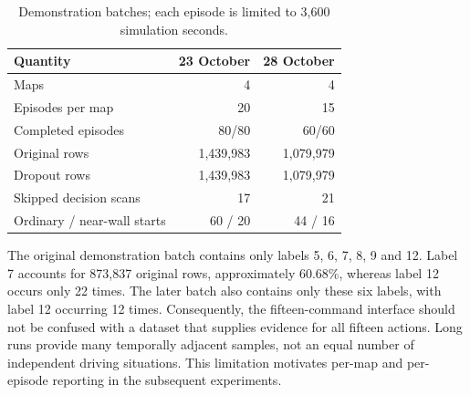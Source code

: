 \begin{table}[htbp]
\centering\small
\caption[Demonstration batch composition]{Demonstration batches; each episode is limited to 3,600 simulation seconds.}
\label{tab:batches}
\begin{tabular}{lrr}
\toprule Quantity & 23 October & 28 October \\\midrule
Maps & 4 & 4 \\
Episodes per map & 20 & 15 \\
Completed episodes & 80/80 & 60/60 \\
Original rows & 1,439,983 & 1,079,979 \\
Dropout rows & 1,439,983 & 1,079,979 \\
Skipped decision scans & 17 & 21 \\
Ordinary / near-wall starts & 60 / 20 & 44 / 16 \\
\bottomrule
\end{tabular}
\end{table}

The original demonstration batch contains only labels 5, 6, 7, 8, 9 and 12. Label 7 accounts
for 873,837 original rows, approximately 60.68\%, whereas label 12 occurs only
22 times. The later batch also contains only these six labels, with label 12
occurring 12 times. Consequently, the fifteen-command interface should not be
confused with a dataset that supplies evidence for all fifteen actions.
Long runs provide many temporally adjacent samples, not an equal number of
independent driving situations. This limitation motivates per-map and
per-episode reporting in the subsequent experiments.
